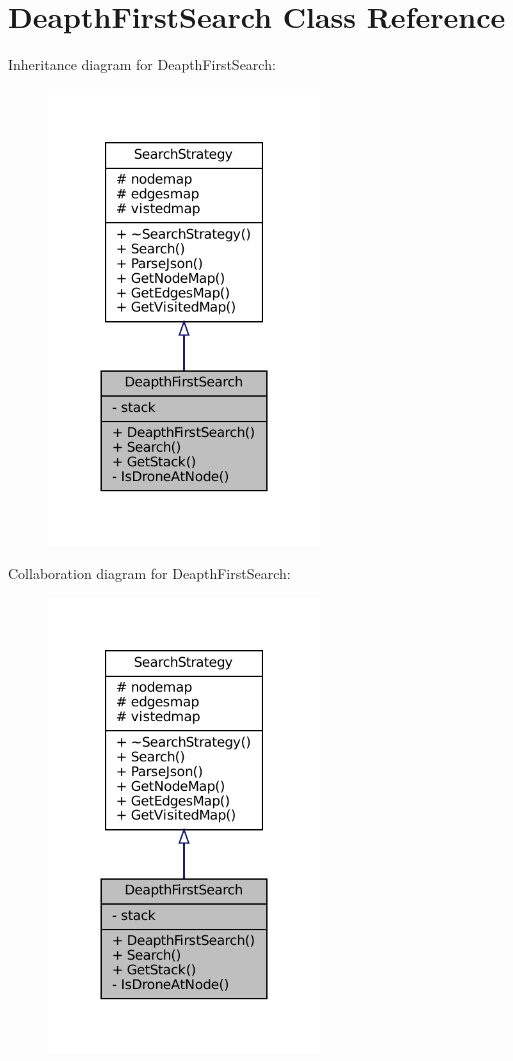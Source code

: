 \hypertarget{classDeapthFirstSearch}{}\section{Deapth\+First\+Search Class Reference}
\label{classDeapthFirstSearch}


Inheritance diagram for Deapth\+First\+Search\+:\nopagebreak
\begin{figure}[H]
\begin{center}
\leavevmode
\includegraphics[width=204pt]{classDeapthFirstSearch__inherit__graph}
\end{center}
\end{figure}


Collaboration diagram for Deapth\+First\+Search\+:\nopagebreak
\begin{figure}[H]
\begin{center}
\leavevmode
\includegraphics[width=204pt]{classDeapthFirstSearch__coll__graph}
\end{center}
\end{figure}
